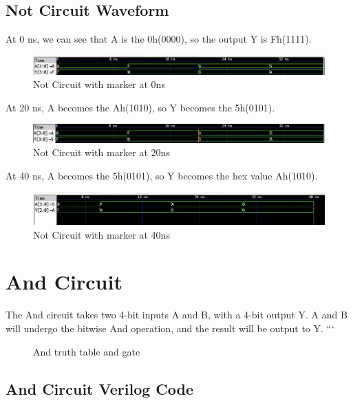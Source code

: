 \documentclass[12pt]{article}
\begin{document}
\subsection{Not Circuit Waveform}
At 0 ns, we can see that A is the 0h(0000), so the output Y is Fh(1111).
\begin{figure}[H]
    \centering
    \includegraphics[width = 1.0\textwidth]{Not/Not-0ns.png}
    \caption{Not Circuit with marker at 0ns}
    \label{fig:enter-label}
\end{figure}

At 20 ns, A becomes the Ah(1010), so Y becomes the 5h(0101).
\begin{figure}[H]
    \centering
    \includegraphics[width = 1.0\textwidth]{Not/Not-20ns.png}
    \caption{Not Circuit with marker at 20ns}
    \label{fig:enter-label}
\end{figure}

At 40 ns, A becomes the 5h(0101), so Y becomes the hex value Ah(1010).
\begin{figure}[H]
    \centering
    \includegraphics[width = 1.0\textwidth]{Not/Not-40ns.png}
    \caption{Not Circuit with marker at 40ns}
    \label{fig:enter-label}
\end{figure}

\section{And Circuit}

The And circuit takes two 4-bit inputs A and B, with a 4-bit output Y. A and B will undergo the bitwise And operation, and the result will be output to Y.
```\begin{figure}[H]
    \centering
    \caption{And truth table and gate}
    \label{fig:shift-table}
\end{figure}
\subsection{And Circuit Verilog Code} 
 
\end{document}
